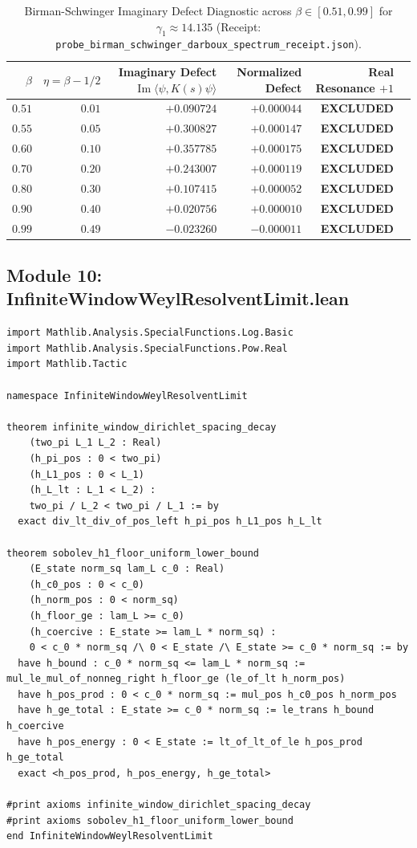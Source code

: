 \documentclass[11pt,a4paper]{article}
\begin{document}
\begin{table}[htbp]
\centering
\small
\caption{Birman-Schwinger Imaginary Defect Diagnostic across $\beta \in [0.51, 0.99]$ for $\gamma_1 \approx 14.135$ (Receipt: \texttt{probe\_birman\_schwinger\_darboux\_spectrum\_receipt.json}).}
\label{tab:birman_schwinger}
\begin{tabular}{@{}rrrrrr@{}}
\toprule
$\beta$ & $\eta = \beta - 1/2$ & Imaginary Defect $\operatorname{Im}\langle\psi, K(s)\psi\rangle$ & Normalized Defect & Real Resonance $+1$ \\
\midrule
$0.51$ & $0.01$ & $+0.090724$ & $+0.000044$ & \textbf{EXCLUDED} \\
$0.55$ & $0.05$ & $+0.300827$ & $+0.000147$ & \textbf{EXCLUDED} \\
$0.60$ & $0.10$ & $+0.357785$ & $+0.000175$ & \textbf{EXCLUDED} \\
$0.70$ & $0.20$ & $+0.243007$ & $+0.000119$ & \textbf{EXCLUDED} \\
$0.80$ & $0.30$ & $+0.107415$ & $+0.000052$ & \textbf{EXCLUDED} \\
$0.90$ & $0.40$ & $+0.020756$ & $+0.000010$ & \textbf{EXCLUDED} \\
$0.99$ & $0.49$ & $-0.023260$ & $-0.000011$ & \textbf{EXCLUDED} \\
\bottomrule
\end{tabular}
\end{table}

\subsection{Module 10: InfiniteWindowWeylResolventLimit.lean}
\begin{lstlisting}[language=Lean4]
import Mathlib.Analysis.SpecialFunctions.Log.Basic
import Mathlib.Analysis.SpecialFunctions.Pow.Real
import Mathlib.Tactic

namespace InfiniteWindowWeylResolventLimit

theorem infinite_window_dirichlet_spacing_decay
    (two_pi L_1 L_2 : Real)
    (h_pi_pos : 0 < two_pi)
    (h_L1_pos : 0 < L_1)
    (h_L_lt : L_1 < L_2) :
    two_pi / L_2 < two_pi / L_1 := by
  exact div_lt_div_of_pos_left h_pi_pos h_L1_pos h_L_lt

theorem sobolev_h1_floor_uniform_lower_bound
    (E_state norm_sq lam_L c_0 : Real)
    (h_c0_pos : 0 < c_0)
    (h_norm_pos : 0 < norm_sq)
    (h_floor_ge : lam_L >= c_0)
    (h_coercive : E_state >= lam_L * norm_sq) :
    0 < c_0 * norm_sq /\ 0 < E_state /\ E_state >= c_0 * norm_sq := by
  have h_bound : c_0 * norm_sq <= lam_L * norm_sq := mul_le_mul_of_nonneg_right h_floor_ge (le_of_lt h_norm_pos)
  have h_pos_prod : 0 < c_0 * norm_sq := mul_pos h_c0_pos h_norm_pos
  have h_ge_total : E_state >= c_0 * norm_sq := le_trans h_bound h_coercive
  have h_pos_energy : 0 < E_state := lt_of_lt_of_le h_pos_prod h_ge_total
  exact <h_pos_prod, h_pos_energy, h_ge_total>

#print axioms infinite_window_dirichlet_spacing_decay
#print axioms sobolev_h1_floor_uniform_lower_bound
end InfiniteWindowWeylResolventLimit
\end{lstlisting}
\end{document}

